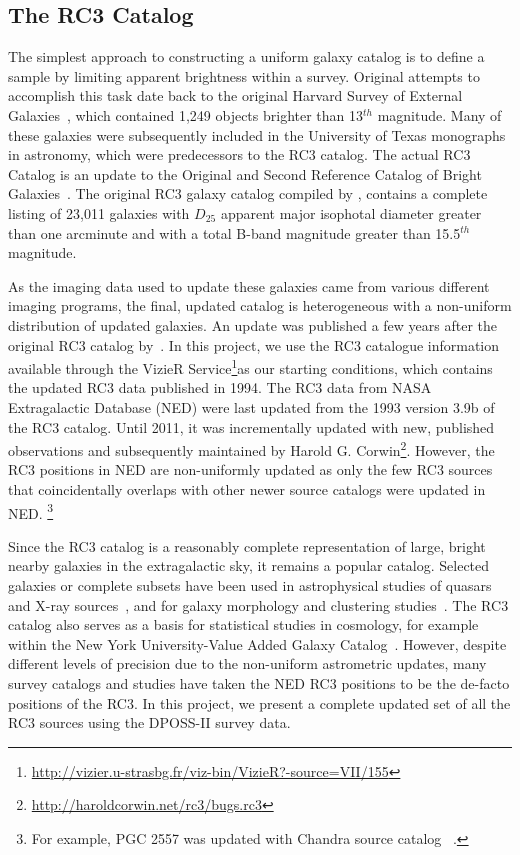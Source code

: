 \documentclass[authoryear, 12pt, 5p, times]{elsarticle}
\begin{document}
\subsection{The RC3 Catalog\label{sec:rc3}}

The simplest approach to constructing a uniform galaxy catalog is to  define a sample by limiting apparent brightness within a survey. Original attempts to accomplish this task date back to the original Harvard Survey of External Galaxies~\citep{shapley-ames}, which contained 1,249 objects brighter than 13$^{th}$ magnitude. Many of these galaxies were subsequently included in the University of Texas monographs in astronomy, which were predecessors to the RC3 catalog. The actual RC3 Catalog is an update to the Original and Second Reference Catalog of Bright Galaxies~\citep{rc2}. The original RC3 galaxy catalog compiled by \citet{rc3}, contains a  complete listing of 23,011 galaxies with $D_{25}$ apparent major isophotal diameter greater than one arcminute and with a total B-band magnitude greater than 15.5$^{th}$ magnitude. 

As the imaging data used to update these galaxies  came from various different imaging programs, the final, updated catalog is heterogeneous with a non-uniform distribution of updated galaxies. An update was published a few years after the original RC3 catalog by~\citet{rc3-94}. In this project, we use the RC3 catalogue information available through the VizieR Service\footnote{\url{http://vizier.u-strasbg.fr/viz-bin/VizieR?-source=VII/155}}as our starting conditions,  which contains the updated RC3 data published in 1994. The RC3 data from  NASA Extragalactic Database (NED) were last updated from the 1993 version 3.9b of the RC3 catalog. Until 2011, it was incrementally updated with new, published observations and subsequently maintained by Harold G. Corwin\footnote{\url{http://haroldcorwin.net/rc3/bugs.rc3}}. However, the RC3 positions in NED are non-uniformly updated as only the few RC3 sources that coincidentally overlaps with other newer source catalogs were updated in NED. \footnote{For example, PGC 2557 was updated with Chandra source catalog ~\citep{chandra}.} 

Since the RC3 catalog  is a reasonably complete representation of large, bright nearby galaxies in the extragalactic sky, it remains a popular catalog. Selected galaxies or complete subsets have been used in astrophysical studies of quasars and X-ray sources~\citep[e.g.,][]{walton-rc3}, and for galaxy morphology and clustering studies~\citep[e.g.,][]{best-rc3, knapen-rc3}.  The RC3 catalog also serves as a basis for statistical studies  in cosmology, for example within the New York University-Value Added Galaxy Catalog~\citep{nyuvagc}. However, despite different levels of precision due to the non-uniform astrometric updates, many survey catalogs and studies have taken the NED RC3 positions to be the de-facto positions of the RC3. In this project, we present a complete updated set of all the RC3 sources using the  DPOSS-II survey data. 
\end{document}
